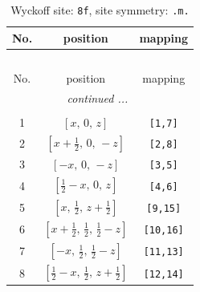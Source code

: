 \documentclass[fleqn,8pt]{jsarticle}
\begin{document}
\begin{longtable}{ccc}
\caption{Wyckoff site: {\tt 8f}, site symmetry: {\tt .m.}}
 \\
 \hline \hline
No. & position & mapping \\ \hline \endfirsthead

\multicolumn{2}{l}{\tablename\ \thetable{}} \\
 \hline \hline
No. & position & mapping \\ \hline \endhead

 \hline \hline
\multicolumn{2}{r}{\footnotesize\it continued ...} \\ \endfoot

 \hline \hline
\multicolumn{2}{r}{} \\ \endlastfoot

1 & $\left[ x,\, 0,\, z \right]$ & {\tt [1,7]} \\ \hline
2 & $\left[ x + \frac{1}{2},\, 0,\, - z \right]$ & {\tt [2,8]} \\ \hline
3 & $\left[ - x,\, 0,\, - z \right]$ & {\tt [3,5]} \\ \hline
4 & $\left[ \frac{1}{2} - x,\, 0,\, z \right]$ & {\tt [4,6]} \\ \hline
5 & $\left[ x,\, \frac{1}{2},\, z + \frac{1}{2} \right]$ & {\tt [9,15]} \\ \hline
6 & $\left[ x + \frac{1}{2},\, \frac{1}{2},\, \frac{1}{2} - z \right]$ & {\tt [10,16]} \\ \hline
7 & $\left[ - x,\, \frac{1}{2},\, \frac{1}{2} - z \right]$ & {\tt [11,13]} \\ \hline
8 & $\left[ \frac{1}{2} - x,\, \frac{1}{2},\, z + \frac{1}{2} \right]$ & {\tt [12,14]} \\
\end{longtable}
\renewcommand{\arraystretch}{1.2}
\end{document}
